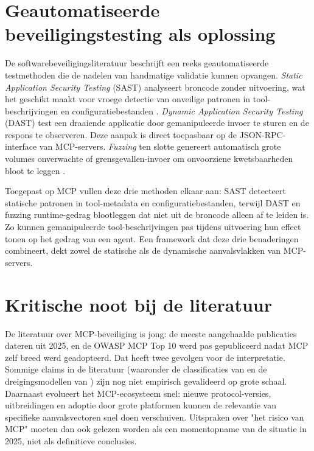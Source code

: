 \section{Geautomatiseerde beveiligingstesting als oplossing}

De softwarebeveiligingsliteratuur beschrijft een reeks geautomatiseerde testmethoden die de nadelen van handmatige validatie kunnen opvangen. \emph{Static Application Security Testing} (SAST) analyseert broncode zonder uitvoering, wat het geschikt maakt voor vroege detectie van onveilige patronen in tool-beschrijvingen en configuratiebestanden \autocite{chess2004static}. \emph{Dynamic Application Security Testing} (DAST) test een draaiende applicatie door gemanipuleerde invoer te sturen en de respons te observeren. Deze aanpak is direct toepasbaar op de JSON-RPC-interface van MCP-servers. \emph{Fuzzing} ten slotte genereert automatisch grote volumes onverwachte of grensgevallen-invoer om onvoorziene kwetsbaarheden bloot te leggen \autocite{manes2019art}.

Toegepast op MCP vullen deze drie methoden elkaar aan: SAST detecteert statische patronen in tool-metadata en configuratiebestanden, terwijl DAST en fuzzing runtime-gedrag blootleggen dat niet uit de broncode alleen af te leiden is. Zo kunnen gemanipuleerde tool-beschrijvingen pas tijdens uitvoering hun effect tonen op het gedrag van een agent. Een framework dat deze drie benaderingen combineert, dekt zowel de statische als de dynamische aanvalsvlakken van MCP-servers.

\section{Kritische noot bij de literatuur}

De literatuur over MCP-beveiliging is jong: de meeste aangehaalde publicaties dateren uit 2025, en de OWASP MCP Top 10 werd pas gepubliceerd nadat MCP zelf breed werd geadopteerd. Dat heeft twee gevolgen voor de interpretatie. Sommige claims in de literatuur (waaronder de classificaties van \textcite{hou2025mcplandscape} en de dreigingsmodellen van \textcite{huang2026mcpthreatmodeling}) zijn nog niet empirisch gevalideerd op grote schaal. Daarnaast evolueert het MCP-ecosysteem snel: nieuwe protocol-versies, uitbreidingen en adoptie door grote platformen kunnen de relevantie van specifieke aanvalsvectoren snel doen verschuiven. Uitspraken over "het risico van MCP" moeten dan ook gelezen worden als een momentopname van de situatie in 2025, niet als definitieve conclusies.


